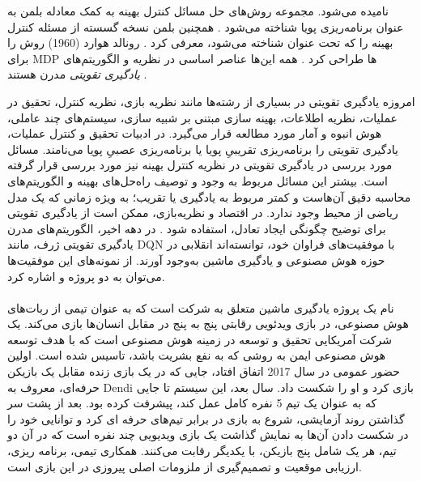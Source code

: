  \textit{
 }نامیده می‌شود. مجموعه روش‌های حل مسائل کنترل بهینه به کمک معادله بلمن به عنوان برنامه‌ریزی پویا شناخته می‌شود
  \cite{bellman1957dynamic}.
   همچنین بلمن نسخه گسسته از مسئله کنترل بهینه را که تحت عنوان 
  \textit{
}
شناخته می‌شود، معرفی کرد
\cite{bellman1957markovian}.
 رونالد هوارد (1960) روش 
\textit{
	}
را برای MDP‌‌ ها طراحی کرد
\cite{howard1960dynamic}. 
همه این‌ها عناصر اساسی در نظریه و الگوریتم‌های \textit{یادگیری تقویتی} مدرن هستند
\cite{suttonbook}.

امروزه یادگیری تقویتی
در بسیاری از رشته‌ها مانند نظریه بازی، نظریه کنترل، تحقیق در عملیات، نظریه اطلاعات، بهینه سازی مبتنی بر شبیه سازی، سیستم‌های چند عاملی، هوش انبوه و آمار مورد مطالعه قرار می‌گیرد. در ادبیات تحقیق و کنترل عملیات، یادگیری تقویتی را برنامه‌ریزی تقریبیِ پویا
  یا برنامه‌ریزی عصبیِ پویا
       می‌نامند. مسائل مورد بررسی در یادگیری تقویتی در نظریه کنترل بهینه
         نیز مورد بررسی قرار گرفته است. بیشتر این مسائل مربوط به وجود و توصیف راه‌حل‌های بهینه و الگوریتم‌های محاسبه دقیق آن‌هاست و کمتر مربوط به یادگیری یا تقریب؛ به ویژه زمانی که یک مدل ریاضی از محیط وجود ندارد. در اقتصاد و نظریه‌بازی، ممکن است از یادگیری تقویتی برای توضیح چگونگی ایجاد تعادل، استفاده شود
\cite{suttonbook}.
در دهه اخیر، الگوریتم‌های مدرن یادگیری تقویتی ژرف، مانند DQN با موفقیت‌های فراوان خود، توانسته‌اند انقلابی در حوزه هوش مصنوعی و یادگیری ماشین به‌وجود آورند. از نمونه‌های این موفقیت‌ها می‌توان به دو پروژه
 و
   اشاره کرد.
\paragraph{}  
   نام یک پروژه یادگیری ماشین متعلق به شرکت 
   است که به عنوان تیمی از ربات‌های هوش مصنوعی، در بازی ویدئویی رقابتی پنج به پنج 
     در مقابل انسان‌ها بازی می‌کند.
\cite{raiman2019long, berner2019dota}
 یک شرکت آمریکایی تحقیق و توسعه در زمینه هوش مصنوعی است که با هدف توسعه هوش مصنوعی ایمن به روشی که به نفع بشریت باشد، تاسیس شده است. اولین حضور عمومی
  در سال 2017 اتفاق افتاد، جایی که در یک بازی زنده مقابل یک بازیکن حرفه‌ای، معروف به Dendi بازی کرد و او را شکست داد. سال بعد، این سیستم تا جایی که به عنوان یک تیم 5 نفره کامل عمل کند، پیشرفت کرده بود. 
  بعد از پشت سر گذاشتن روند آزمایشی، شروع به بازی در برابر تیم‌های حرفه ای کرد و توانایی خود را در شکست دادن آن‌ها به نمایش گذاشت
  یک بازی ویدیویی چند نفره است که در آن دو تیم، هر یک شامل پنج بازیکن، با یکدیگر رقابت می‌کنند. همکاری تیمی، برنامه ریزی، ارزیابی موقعیت و تصمیم‌گیری از ملزومات اصلی پیروزی در این بازی است.

